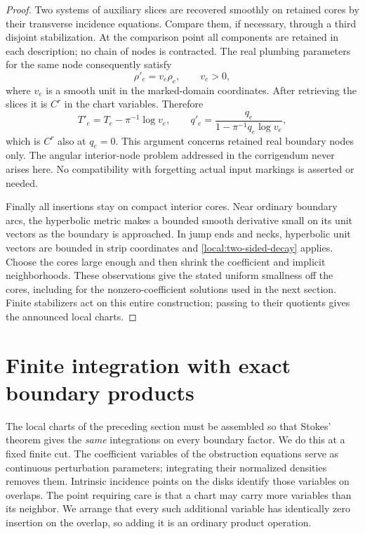 \documentclass[11pt]{article}
\theoremstyle{definition}
\theoremstyle{remark}
\numberwithin{equation}{section}
\begin{document}
\begin{proof}
Two systems of auxiliary slices are recovered smoothly on retained
cores by their transverse incidence equations.  Compare them, if
necessary, through a third disjoint stabilization.  At the comparison
point all components are retained in each description; no chain of
nodes is contracted.  The real plumbing parameters for the same
node consequently satisfy
\[
 \rho'_e=v_e\rho_e,\qquad v_e>0,
\]
where $v_e$ is a smooth unit in the marked-domain coordinates.  After
retrieving the slices it is $C^r$ in the chart variables.  Therefore
\[
 T'_e=T_e-\pi^{-1}\log v_e,\qquad
 q'_e=\frac{q_e}{1-\pi^{-1}q_e\log v_e},
\]
which is $C^r$ also at $q_e=0$.  This argument concerns retained real
boundary nodes only.  The angular interior-node problem addressed
in the corrigendum \cite[Section~1]{fooo-corr} never arises here.
No compatibility with forgetting actual input markings is asserted
or needed.

Finally all insertions stay on compact interior cores.  Near ordinary
boundary arcs, the hyperbolic metric makes a bounded smooth derivative
small on its unit vectors as the boundary is approached.  In jump
ends and necks, hyperbolic unit vectors are bounded in strip
coordinates and \eqref{local:two-sided-decay} applies.  Choose the
cores large enough and then shrink the coefficient and implicit
neighborhoods.  These observations give the stated uniform smallness
off the cores, including for the nonzero-coefficient solutions used
in the next section.  Finite stabilizers act on this entire construction;
passing to their quotients gives the announced local charts.
\end{proof}

\section{Finite integration with exact boundary products}
\label{virt:section}

The local charts of the preceding section must be assembled so that Stokes'
theorem gives the \emph{same} integrations on every boundary factor.  We do
this at a fixed finite cut.  The coefficient variables of the obstruction
equations serve as continuous perturbation parameters; integrating their
normalized densities removes them.  Intrinsic incidence points on the
disks identify those variables on overlaps.  The point requiring care is
that a chart may carry more variables than its neighbor.  We arrange that
every such additional variable has identically zero insertion on the
overlap, so adding it is an ordinary product operation.
\end{document}
